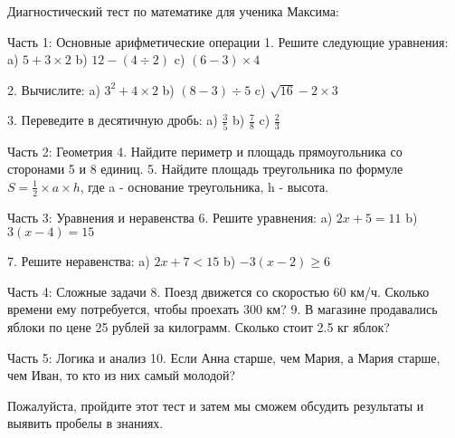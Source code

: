 \documentclass{article}
\begin{document}
Диагностический тест по математике для ученика Максима:

Часть 1: Основные арифметические операции
1. Решите следующие уравнения:
   a) \(5 + 3 \times 2\)
   b) \(12 - (4 \div 2)\)
   c) \((6 - 3) \times 4\)

2. Вычислите:
   a) \(3^2 + 4 \times 2\)
   b) \((8 - 3) \div 5\)
   c) \(\sqrt{16} - 2 \times 3\)

3. Переведите в десятичную дробь:
   a) \( \frac{3}{5} \)
   b) \( \frac{7}{8} \)
   c) \( \frac{2}{3} \)

Часть 2: Геометрия
4. Найдите периметр и площадь прямоугольника со сторонами 5 и 8 единиц.
5. Найдите площадь треугольника по формуле \(S = \frac{1}{2} \times a \times h\), где a - основание треугольника, h - высота.

Часть 3: Уравнения и неравенства
6. Решите уравнения:
   a) \(2x + 5 = 11\)
   b) \(3(x - 4) = 15\)

7. Решите неравенства:
   a) \(2x + 7 < 15\)
   b) \(-3(x - 2) \geq 6\)

Часть 4: Сложные задачи
8. Поезд движется со скоростью 60 км/ч. Сколько времени ему потребуется, чтобы проехать 300 км?
9. В магазине продавались яблоки по цене 25 рублей за килограмм. Сколько стоит 2.5 кг яблок?

Часть 5: Логика и анализ
10. Если Анна старше, чем Мария, а Мария старше, чем Иван, то кто из них самый молодой?

Пожалуйста, пройдите этот тест и затем мы сможем обсудить результаты и выявить пробелы в знаниях.
\end{document}
